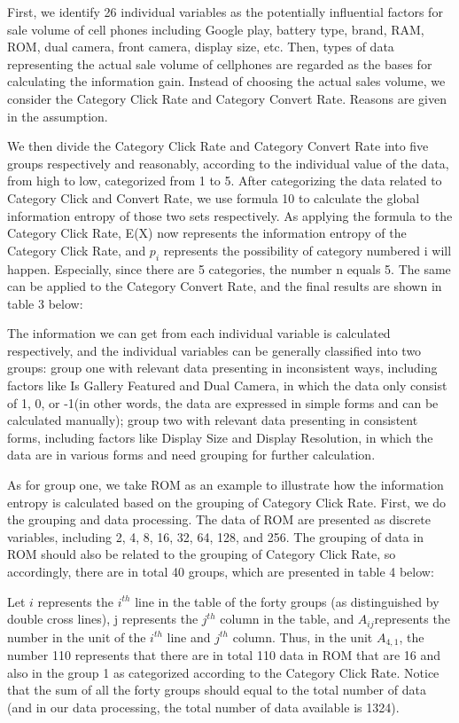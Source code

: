 First, we identify 26 individual variables as the potentially influential factors for sale volume of cell phones including Google play, battery type, brand, RAM, ROM, dual camera, front camera, display size, etc. Then, types of data representing the actual sale volume of cellphones are regarded as the bases for calculating the information gain. Instead of choosing the actual sales volume, we consider the Category Click Rate and Category Convert Rate. Reasons are given in the assumption. 

We then divide the Category Click Rate and Category Convert Rate into five groups respectively and reasonably, according to the individual value of the data, from high to low, categorized from 1 to 5. After categorizing the data related to Category Click and Convert Rate, we use formula 10 to calculate the global information entropy of those two sets respectively. As applying the formula to the Category Click Rate, E(X) now represents the information entropy of the Category Click Rate, and $p _ { i }$ represents the possibility of category numbered i will happen. Especially, since there are 5 categories, the number n equals 5. The same can be applied to the Category Convert Rate, and the final results are shown in table 3 below:

The information we can get from each individual variable is calculated respectively, and the individual variables can be generally classified into two groups: group one with relevant data presenting in inconsistent ways, including factors like Is Gallery Featured and Dual Camera, in which the data only consist of 1, 0, or -1(in other words, the data are expressed in simple forms and can be calculated manually); group two with relevant data presenting in consistent forms, including factors like Display Size and Display Resolution, in which the data are in various forms and need grouping for further calculation.

As for group one, we take ROM as an example to illustrate how the information entropy is calculated based on the grouping of Category Click Rate. First, we do the grouping and data processing. The data of ROM are presented as discrete variables, including 2, 4, 8, 16, 32, 64, 128, and 256. The grouping of data in ROM should also be related to the grouping of Category Click Rate, so accordingly, there are in total 40 groups, which are presented in table 4 below: 

Let $i$ represents the $i ^ { t h }$ line in the table of the forty groups (as distinguished by double cross lines), j represents the $j ^ { t h }$ column in the table, and $A _ { i j }$represents the number in the unit of the  $i ^ { t h }$ line and $j ^ { t h }$   column. Thus, in the unit $A _ { 4,1 }$, the number 110 represents that there are in total 110 data in ROM that are 16 and also in the group 1 as categorized according to the Category Click Rate. Notice that the sum of all the forty groups should equal to the total number of data (and in our data processing, the total number of data available is 1324). 

